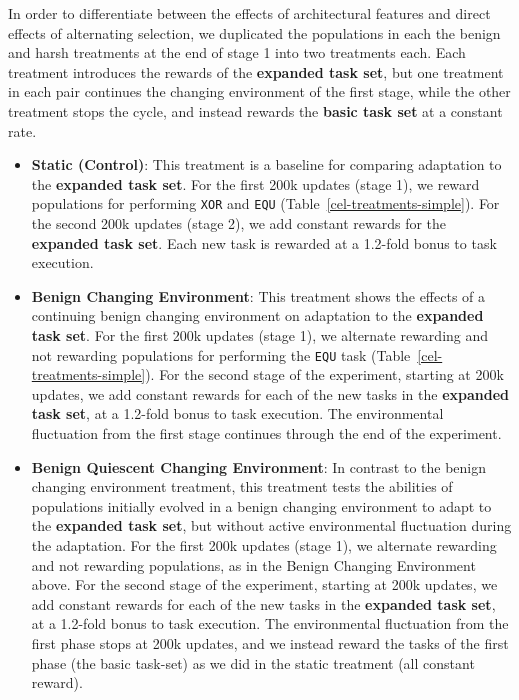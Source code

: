 \documentclass[10pt,letterpaper,final]{article}
\begin{document}
In order to differentiate between the effects of architectural features and direct effects of alternating selection, we duplicated the populations in each the benign and harsh treatments at the end of stage 1 into two treatments each. Each treatment introduces the rewards of the \textbf{expanded task set}, but one treatment in each pair continues the changing environment of the first stage, while the other treatment stops the cycle, and instead rewards the \textbf{basic task set} at a constant rate.

\begin{itemize}
	\item \textbf{Static (Control)}: This treatment is a baseline for comparing adaptation to the \textbf{expanded task set}. For the first 200k updates (stage 1), we reward populations for performing  \texttt{XOR} and \texttt{EQU} (Table~\ref{cel-treatments-simple}). For the second 200k updates (stage 2), we add constant rewards for the \textbf{expanded task set}. Each new task is rewarded at a 1.2-fold bonus to task execution.

	\item \textbf{Benign Changing Environment}: This treatment shows the effects of a continuing benign changing environment on adaptation to the \textbf{expanded task set}. For the first 200k updates (stage 1), we alternate rewarding and not rewarding populations for performing the \texttt{EQU} task (Table~\ref{cel-treatments-simple}). For the second stage of the experiment, starting at 200k updates, we add constant rewards for each of the new tasks in the \textbf{expanded task set}, at a 1.2-fold bonus to task execution. The environmental fluctuation from the first stage continues through the end of the experiment.

	\item \textbf{Benign Quiescent Changing Environment}: In contrast to the benign changing environment treatment, this treatment tests the abilities of populations initially evolved in a benign changing environment to adapt to the \textbf{expanded task set}, but without active environmental fluctuation during the adaptation. For the first 200k updates (stage 1), we alternate rewarding and not rewarding populations, as in the Benign Changing Environment above. For the second stage of the experiment, starting at 200k updates, we add constant rewards for each of the new tasks in the \textbf{expanded task set}, at a 1.2-fold bonus to task execution. The environmental fluctuation from the first phase stops at 200k updates, and we instead reward the tasks of the first phase (the basic task-set) as we did in the static treatment (all constant reward).


\end{itemize}
\end{document}
